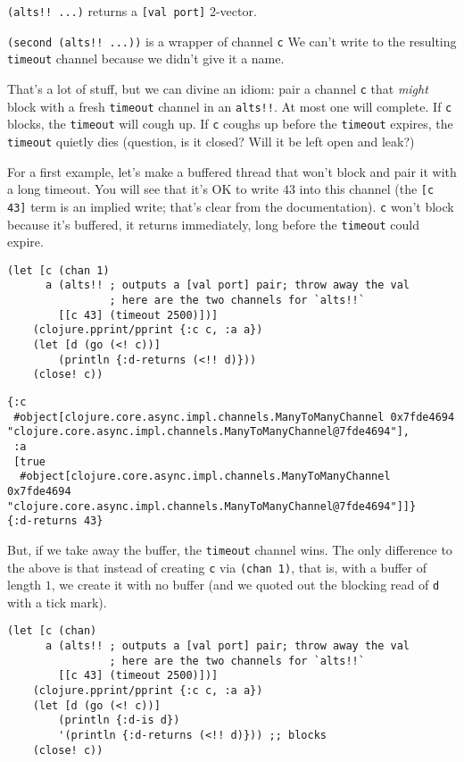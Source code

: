\documentclass[10pt,oneside,x11names]{article}
\begin{document}
\texttt{(alts!! ...)} returns a \texttt{[val port]} 2-vector.

\texttt{(second (alts!! ...))} is a wrapper of channel \texttt{c} We can't write to
the resulting \texttt{timeout} channel because we didn't give it a name.

That's a lot of stuff, but we can divine an idiom: pair a channel \texttt{c}
that \emph{might} block with a fresh \texttt{timeout} channel in an \texttt{alts!!}. At
most one will complete. If \texttt{c} blocks, the \texttt{timeout} will cough up. If
\texttt{c} coughs up before the \texttt{timeout} expires, the \texttt{timeout} quietly dies
(question, is it closed? Will it be left open and leak?)

For a first example, let's make a buffered thread that won't block and
pair it with a long timeout. You will see that it's OK to write \(43\)
into this channel (the \texttt{[c 43]} term is an implied write; that's clear
from the documentation). \texttt{c} won't block because it's buffered, it
returns immediately, long before the \texttt{timeout} could expire.

\begin{verbatim}
(let [c (chan 1)
      a (alts!! ; outputs a [val port] pair; throw away the val
                ; here are the two channels for `alts!!`
        [[c 43] (timeout 2500)])]
    (clojure.pprint/pprint {:c c, :a a})
    (let [d (go (<! c))]
        (println {:d-returns (<!! d)}))
    (close! c))
\end{verbatim}

\begin{verbatim}
{:c
 #object[clojure.core.async.impl.channels.ManyToManyChannel 0x7fde4694 "clojure.core.async.impl.channels.ManyToManyChannel@7fde4694"],
 :a
 [true
  #object[clojure.core.async.impl.channels.ManyToManyChannel 0x7fde4694 "clojure.core.async.impl.channels.ManyToManyChannel@7fde4694"]]}
{:d-returns 43}
\end{verbatim}


But, if we take away the buffer, the \texttt{timeout} channel wins. The only
difference to the above is that instead of creating \texttt{c} via \texttt{(chan 1)},
that is, with a buffer of length \(1\), we create it with no buffer (and
we quoted out the blocking read of \texttt{d} with a tick mark).

\begin{verbatim}
(let [c (chan)
      a (alts!! ; outputs a [val port] pair; throw away the val
                ; here are the two channels for `alts!!`
        [[c 43] (timeout 2500)])]
    (clojure.pprint/pprint {:c c, :a a})
    (let [d (go (<! c))]
        (println {:d-is d})
        '(println {:d-returns (<!! d)})) ;; blocks
    (close! c))
\end{verbatim}
\end{document}
